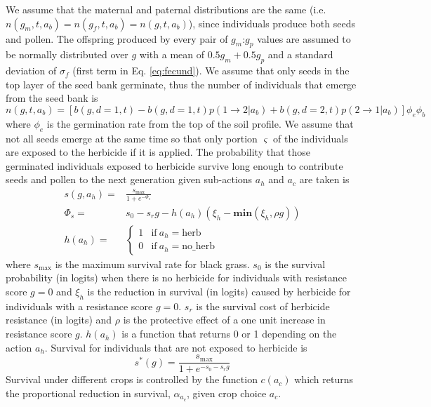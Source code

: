 \documentclass[12pt, a4paper]{article}
\begin{document}
We assume that the maternal and paternal distributions are the same (i.e. $n(g_m, t, a_b) = n(g_f, t, a_b) = n(g, t, a_b)$), since individuals produce both seeds and pollen. The offspring produced by every pair of $g_m$:$g_p$ values are assumed to be normally distributed over $g$ with a mean of $0.5g_m + 0.5g_p$ and a standard deviation of $\sigma_f$ (first term in Eq. \ref{eq:fecund}). We assume that only seeds in the top layer of the seed bank germinate, thus the number of individuals that emerge from the seed bank is
\begin{equation}\label{eq:above_ground}
	n(g, t, a_b) = [b(g, d = 1, t) - b(g, d = 1, t)p(1 \rightarrow 2|a_b) + b(g, d = 2, t)p(2 \rightarrow 1|a_b)]\phi_e\phi_b
\end{equation}
where $\phi_e$ is the germination rate from the top of the soil profile. We assume that not all seeds emerge at the same time so that only portion $\varsigma$ of the individuals are exposed to the herbicide if it is applied. The probability that those germinated individuals exposed to herbicide survive long enough to contribute seeds and pollen to the next generation given sub-actions $a_h$ and $a_c$ are taken is 
\begin{align}\label{eq:survival_herb}
	s(g, a_h) =& \frac{s_\text{max}}{1 + e^{-\Phi_s}}\\
	\Phi_s =& s_0 - s_rg - h(a_h)\left(\xi_h - \textbf{min}(\xi_h, \rho g) \right)\\
	h(a_h) =& \begin{cases}
		1 &\text{if}~a_h = \text{herb}\\
		0 &\text{if}~a_h = \text{no\_herb}
	\end{cases}
\end{align}
where $s_\text{max}$ is the maximum survival rate for black grass. $s_0$ is the survival probability (in logits) when there is no herbicide for individuals with resistance score $g = 0$ and $\xi_h$ is the reduction in survival (in logits) caused by herbicide for individuals with a resistance score $g = 0$. $s_r$ is the survival cost of herbicide resistance (in logits) and $\rho$ is the protective effect of a one unit increase in resistance score $g$. $h(a_h)$ is a function that returns 0 or 1 depending on the action $a_h$. Survival for individuals that are not exposed to herbicide is   
\begin{equation}\label{eq:survival_noherb}
	s^*(g) = \frac{s_\text{max}}{1 + e^{-s_0 - s_rg}}
\end{equation}
Survival under different crops is controlled by the function $c(a_c)$ which returns the proportional reduction in survival, $\alpha_{a_c}$, given crop choice $a_c$.
\end{document}
